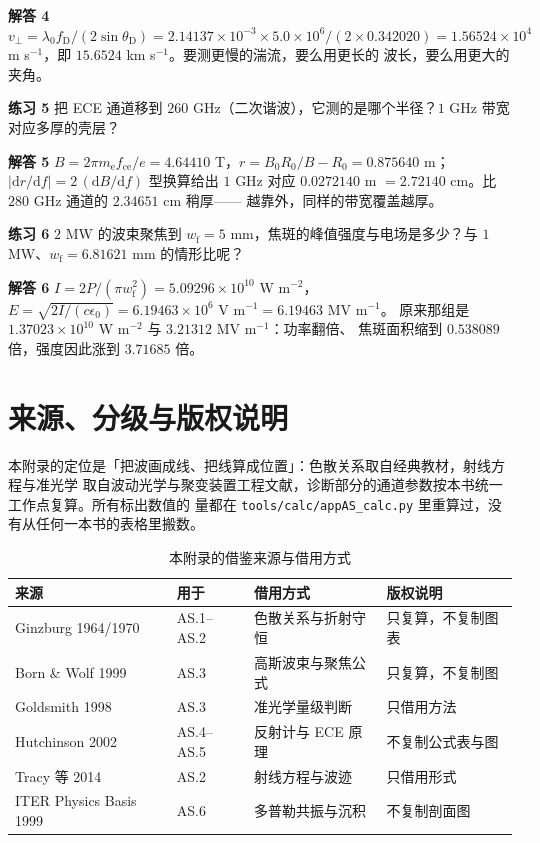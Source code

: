 \textbf{解答 4}
$v_\perp=\lambda_0f_\mathrm{D}/(2\sin\theta_\mathrm{D})
=2.14137\times10^{-3}\times5.0\times10^{6}/(2\times0.342020)
=1.56524\times10^{4}$ m s$^{-1}$，即 $15.6524$ km s$^{-1}$。要测更慢的湍流，要么用更长的
波长，要么用更大的夹角。

\textbf{练习 5}
把 ECE 通道移到 $260$ GHz（二次谐波），它测的是哪个半径？$1$ GHz 带宽对应多厚的壳层？

\textbf{解答 5}
$B=2\pi m_\mathrm{e}f_\mathrm{ce}/e=4.64410$ T，$r=B_0R_0/B-R_0=0.875640$ m；
$|\mathrm{d}r/\mathrm{d}f|=2\,(\mathrm{d}B/\mathrm{d}f)$ 型换算给出
$1$ GHz 对应 $0.0272140$ m $=2.72140$ cm。比 $280$ GHz 通道的 $2.34651$ cm 稍厚——
越靠外，同样的带宽覆盖越厚。

\textbf{练习 6}
$2$ MW 的波束聚焦到 $w_\mathrm{f}=5$ mm，焦斑的峰值强度与电场是多少？与
$1$ MW、$w_\mathrm{f}=6.81621$ mm 的情形比呢？

\textbf{解答 6}
$I=2P/(\pi w_\mathrm{f}^2)=5.09296\times10^{10}$ W m$^{-2}$，
$E=\sqrt{2I/(c\epsilon_0)}=6.19463\times10^{6}$ V m$^{-1}=6.19463$ MV m$^{-1}$。
原来那组是 $1.37023\times10^{10}$ W m$^{-2}$ 与 $3.21312$ MV m$^{-1}$：功率翻倍、
焦斑面积缩到 $0.538089$ 倍，强度因此涨到 $3.71685$ 倍。

\section{来源、分级与版权说明}
\label{sec:app-as-source}

\begingroup\small
本附录的定位是「把波画成线、把线算成位置」：色散关系取自经典教材，射线方程与准光学
取自波动光学与聚变装置工程文献，诊断部分的通道参数按本书统一工作点复算。所有标出数值的
量都在 \texttt{tools/\allowbreak{}calc/\allowbreak{}appAS\_calc.py} 里重算过，没有从任何一本书的表格里搬数。

\begin{table}[htbp]
\centering
\small
\caption{本附录的借鉴来源与借用方式}
\label{tab:app-as-source}
\begin{tabular}{p{4.2cm}p{2.4cm}p{2.4cm}p{3.8cm}}
\hline
来源 & 用于 & 借用方式 & 版权说明 \\
\hline
Ginzburg 1964/1970 & AS.1--AS.2 & 色散关系与折射守恒 & 只复算，不复制图表 \\
Born \& Wolf 1999 & AS.3 & 高斯波束与聚焦公式 & 只复算，不复制图 \\
Goldsmith 1998 & AS.3 & 准光学量级判断 & 只借用方法 \\
Hutchinson 2002 & AS.4--AS.5 & 反射计与 ECE 原理 & 不复制公式表与图 \\
Tracy 等 2014 & AS.2 & 射线方程与波迹 & 只借用形式 \\
ITER Physics Basis 1999 & AS.6 & 多普勒共振与沉积 & 不复制剖面图 \\
\hline
\end{tabular}
\end{table}

